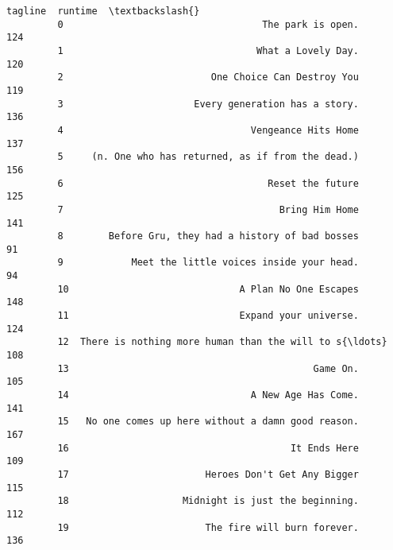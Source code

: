\documentclass[11pt]{article}
\begin{document}
\begin{Verbatim}[commandchars=\\\{\}]
                                                       tagline  runtime  \textbackslash{}
         0                                   The park is open.      124   
         1                                  What a Lovely Day.      120   
         2                          One Choice Can Destroy You      119   
         3                       Every generation has a story.      136   
         4                                 Vengeance Hits Home      137   
         5     (n. One who has returned, as if from the dead.)      156   
         6                                    Reset the future      125   
         7                                      Bring Him Home      141   
         8        Before Gru, they had a history of bad bosses       91   
         9            Meet the little voices inside your head.       94   
         10                              A Plan No One Escapes      148   
         11                              Expand your universe.      124   
         12  There is nothing more human than the will to s{\ldots}      108   
         13                                           Game On.      105   
         14                                A New Age Has Come.      141   
         15   No one comes up here without a damn good reason.      167   
         16                                       It Ends Here      109   
         17                        Heroes Don't Get Any Bigger      115   
         18                    Midnight is just the beginning.      112   
         19                        The fire will burn forever.      136   
         

\end{Verbatim}
\end{document}
